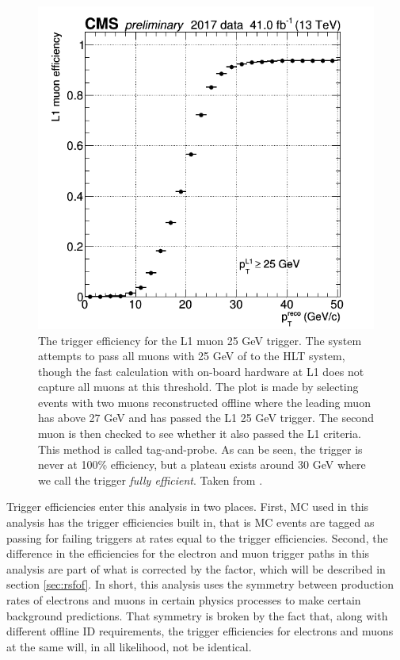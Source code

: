     \begin{figure}[h!]
      \centering
      \includegraphics[width=.7\textwidth]{figures/muon_l1_eff.png}
      \caption[The trigger efficiency for the L1 muon 25 GeV trigger.]{The trigger efficiency for the L1 muon 25 GeV trigger. The system attempts to pass all muons with 25 GeV of \pt to the HLT system, though the fast calculation with on-board hardware at L1 does not capture all muons at this threshold. The plot is made by selecting events with two muons reconstructed offline where the leading \pt muon has \pt above 27 GeV and has passed the L1 25 GeV trigger. The second muon is then checked to see whether it also passed the L1 criteria. This method is called tag-and-probe. As can be seen, the trigger is never at 100\% efficiency, but a plateau exists around 30 GeV where we call the trigger \emph{fully efficient}. Taken from \cite{mu_l1_twiki}.}
      \label{fig:mu_l1_eff}
    \end{figure}

    Trigger efficiencies enter this analysis in two places. First, MC used in this analysis has the trigger efficiencies built in, that is MC events are tagged as passing for failing triggers at rates equal to the trigger efficiencies. Second, the difference in the efficiencies for the electron and muon trigger paths in this analysis are part of what is corrected by the \rsfof factor, which will be described in section \ref{sec:rsfof}. In short, this analysis uses the symmetry between production rates of electrons and muons in certain physics processes to make certain background predictions. That symmetry is broken by the fact that, along with different offline ID requirements, the trigger efficiencies for electrons and muons at the same \pt will, in all likelihood, not be identical.

